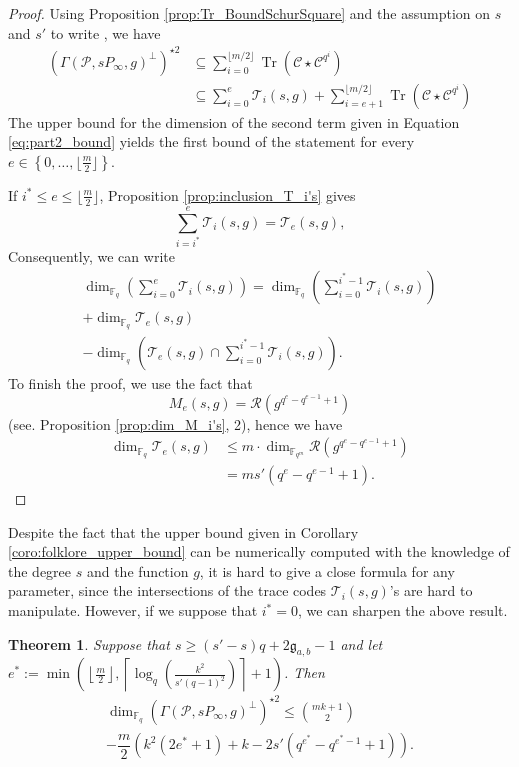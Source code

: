 \documentclass[lettersize,journal]{IEEEtran}
\theoremstyle{plain}
\newtheorem{thm}{Theorem}[section]
\theoremstyle{definition}
\theoremstyle{remark}
\DeclareMathOperator{\trace}{Tr}
\newcommand{\calP}{\mathcal{P}}
\newcommand{\calC}{\mathcal{C}}
\newcommand{\calR}{\mathcal{R}}
\newcommand{\calT}{\mathcal{T}}
\newcommand{\fqm}{\mathbb{F}_{q^m}}
\newcommand{\fq}{\mathbb{F}_{q}}
\newcommand{\Tr}[1]{\trace\!\left(#1\right)}
\newcommand{\set}[1]{\left\{#1\right\}}
\begin{document}
	\begin{proof}
		Using Proposition \ref{prop:Tr_BoundSchurSquare} and the assumption on $s$ and $s'$ to write , we have
		\begin{align*}
			\left(\Gamma(\calP,sP_\infty,g)^{\perp}\right)^{\star 2}
			& \subseteq \sum\limits_{i=0}^{\lfloor m/2 \rfloor} \Tr{\calC \star                     \calC^{q^i}} \\
			& \subseteq \sum\limits_{i=0}^{e}\calT_i(s,g) + \sum\limits_{i=e+1}^{\lfloor m/2 \rfloor} \Tr{\calC \star \calC^{q^i}}
		\end{align*}
		The upper bound for the dimension of the second term given in Equation \eqref{eq:part2_bound} yields the first bound of the statement for every $e \in \set{0,\dots,\lfloor \frac{m}{2} \rfloor}$.
		
		\medskip
		
		If $i^* \leq e \leq \lfloor \frac{m}{2} \rfloor$,  Proposition \ref{prop:inclusion_T_i's} gives
		\[\sum\limits_{i=i^*}^e \calT_i(s,g) = \calT_e(s,g),\]
		Consequently, we can write 
		\begin{multline}
		\dim_{\fq} \left(\sum\limits_{i=0}^{e}\calT_i(s,g)\right) = \dim_{\fq} \left(\sum\limits_{i=0}^{i^*-1}\calT_i(s,g)\right) \\ + \dim_{\fq}\calT_e(s,g)  \\- \dim_{\fq} \left( \calT_e(s,g) \cap   \sum\limits_{i=0}^{i^*-1} \calT_i(s,g)\right).
		\end{multline}
		To finish the proof, we use the fact that 
		\[M_e(s,g) = \calR\left(g^{q^e-q^{e-1}+1}\right)\]
		(see. Proposition \ref{prop:dim_M_i's}, 2), hence we have
		\begin{align}
			\dim_{\fq}\calT_e(s,g) &\leq m \cdot \dim_{\fqm} \calR\left(g^{q^e-q^{e-1}+1}\right)\\ \label{eq:dimTe}
								   & = m s' (q^e-q^{e-1}+1).
		\end{align}
	\end{proof}
	
	Despite the fact that the upper bound given in Corollary \ref{coro:folklore_upper_bound} can be numerically computed with the knowledge of the degree $s$ and the function $g$, it is hard to give a close formula for any parameter, since the intersections of the trace codes $\calT_i(s,g)$'s are hard to manipulate. However, if we suppose that $i^*=0$, we can sharpen the above result.
	
	\begin{thm} \label{thm:bound_with_T_i's_inclusion} 
		Suppose that $s \geq (s'-s)q+2\mathfrak{g}_{a,b}-1$ and let $e^* := \min\left(\left\lfloor \frac{m}{2} \right\rfloor, \left\lceil \log_q\left(\frac{k^2}{s'(q-1)^2}\right)\right\rceil+1\right)$. Then
\begin{multline*}
		\dim_{\fq} (\Gamma(\calP,sP_\infty,g)^{\perp})^{\star 2}\leq \binom{mk+1}{2} \\- \dfrac{m}{2}(k^2(2e^*+1)+k-2s'(q^{e^*}-q^{e^*-1}+1)).
\end{multline*}		
	\end{thm}
	
\end{document}
